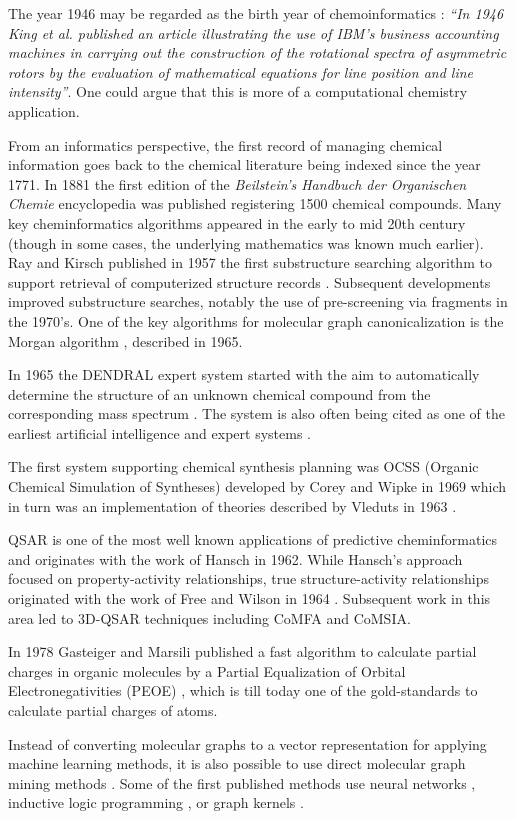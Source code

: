 \documentclass{sig-alternate}
\begin{document}
The year 1946 may be regarded as the birth year of chemoinformatics
\cite{Chen2006}: \textit{``In 1946 King et al.\cite{kct1946} published
  an article illustrating the use of IBM's business accounting
  machines in carrying out the construction of the rotational spectra
  of asymmetric rotors by the evaluation of mathematical equations for
  line position and line intensity''}. One could argue that this is
more of a computational chemistry application.  

From an informatics perspective, the first record of managing chemical
information goes back to the chemical literature being indexed since
the year 1771.  In 1881 the first edition of the \textit{Beilstein's
  Handbuch der Organischen Chemie} encyclopedia was published
\cite{polanski2009} registering 1500 chemical compounds.  Many key
cheminformatics algorithms appeared in the early to mid 20th century
(though in some cases, the underlying mathematics was known much
earlier). Ray and Kirsch published in 1957 the first substructure
searching algorithm to support retrieval of computerized structure
records \cite{RayKirsch1957}. Subsequent developments improved
substructure searches, notably the use of pre-screening via fragments
\cite{Adamson:1973fk,Feldman:1975uq} in the 1970's. One of the key
algorithms for molecular graph canonicalization is the Morgan
algorithm \cite{Morgan1965}, described in 1965.

In 1965 the DENDRAL expert system started with the aim to
automatically determine the structure of an unknown chemical compound
from the corresponding mass spectrum \cite{Gray1986}. The system is
also often being cited as one of the earliest artificial intelligence
and expert systems \cite{Chen2006}.

The first system supporting chemical synthesis planning was OCSS
(Organic Chemical Simulation of Syntheses) developed by Corey and
Wipke in 1969 \cite{CoreyWipke1969} which in turn was an
implementation of theories described by Vleduts in 1963
\cite{Vleduts:1963kx}.

QSAR is one of the most well known applications of predictive
cheminformatics and originates with the work of Hansch
\cite{Hansch:1962vn} in 1962. While Hansch's approach focused on
property-activity relationships, true structure-activity relationships
originated with the work of Free and Wilson in 1964
\cite{Free:1964ys}. Subsequent work in this area led to 3D-QSAR
techniques including CoMFA \cite{Cramer:1988zr} and
CoMSIA\cite{Klebe:1994ly}.

In 1978 Gasteiger and Marsili published a fast algorithm to calculate
partial charges in organic molecules by a Partial Equalization of
Orbital Electronegativities (PEOE) \cite{gm78}, which is till today
one of the gold-standards to calculate partial charges of atoms.

Instead of converting molecular graphs to a vector representation for
applying machine learning methods, it is also possible to use direct
molecular graph mining methods \cite{okada2006}. Some of the first
published methods use neural networks \cite{kireev1995}, inductive
logic programming \cite{yh02a}, or graph kernels \cite{kti03}.

 
\end{document}
